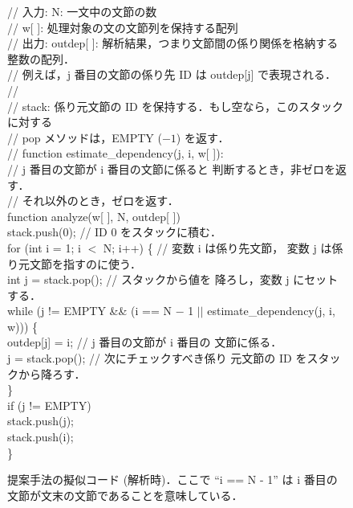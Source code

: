 \documentclass[japanese]{jnlp_1.2c}
\begin{document}
\begin{figure}[t]
// 入力: N: 一文中の文節の数 \\
// \hspace*{1em}  w[ ]: 処理対象の文の文節列を保持する配列 \\
// 出力: outdep[ ]: 解析結果，つまり文節間の係り関係を格納する整数の配列． \\
// \hspace*{1em} 例えば，j 番目の文節の係り先 ID は {\rm outdep[j]} 
で表現される． \\
// \\
// stack: 係り元文節の ID を保持する．もし空なら，このスタックに対する \\
// \hspace*{1em} pop メソッドは，{\rm EMPTY} ($-1$) を返す． \\
// function estimate\_dependency(j, i, w[ ]): \\
// \hspace*{1em} {\rm j} 番目の文節が {\rm i} 番目の文節に係ると
判断するとき，非ゼロを返す． \\
// \hspace*{1em} それ以外のとき，ゼロを返す． \\
function analyze(w[ ], N, outdep[ ]) \\
stack.push(0); \hspace*{1em} // ID 0 をスタックに積む． \\
for (int i = 1; i $<$ N; i++) \{ \hspace*{1em} // 変数 i は係り先文節，
変数 j は係り元文節を指すのに使う．\\
\hspace*{1em}  int j = stack.pop(); \hspace*{1em} // スタックから値を
降ろし，変数 j にセットする． \\
\hspace*{1em} while (j != EMPTY \&\& (i == N $-$ 1 $||$ estimate\_dependency(j, i, w))) \{ \\
\hspace*{2em} outdep[j] = i; \hspace*{1em} // j 番目の文節が i 番目の
文節に係る． \\
\hspace*{2em} j = stack.pop(); \hspace*{1em} // 次にチェックすべき係り
元文節の ID をスタックから降ろす． \\
\hspace*{1em}  \} \\
\hspace*{1em}  if (j != EMPTY) \\
\hspace*{2em}    stack.push(j); \\
\hspace*{1em}  stack.push(i); \\
 \}
\par\vspace{8pt}
\caption{提案手法の擬似コード (解析時)．ここで ``i == N - 1''
は i 番目の文節が文末の文節であることを\hspace*{27pt}意味している．}
\label{code:analysis}
\end{figure}
\end{document}
